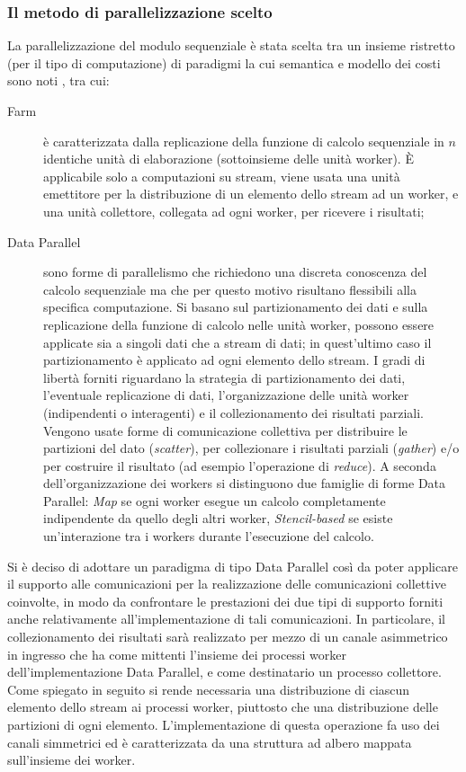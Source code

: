 \subsubsection{Il metodo di parallelizzazione scelto}
La parallelizzazione del modulo sequenziale \`e stata scelta tra un insieme ristretto (per il tipo di computazione) di paradigmi la cui semantica e modello dei costi sono noti \cite{hpc_part1}, tra cui:
\begin{description}
\item [Farm] \`e caratterizzata dalla replicazione della funzione di calcolo sequenziale in $n$ identiche unit\`a di elaborazione (sottoinsieme delle unit\`a worker). \`E applicabile solo a computazioni su stream, viene usata una unit\`a emettitore per la distribuzione di un elemento dello stream ad un worker, e una unit\`a collettore, collegata ad ogni worker, per ricevere i risultati;
\item [Data Parallel] sono forme di parallelismo che richiedono una discreta conoscenza del calcolo sequenziale ma che per questo motivo risultano flessibili alla specifica computazione. Si basano sul partizionamento dei dati e sulla replicazione della funzione di calcolo nelle unit\`a worker, possono essere applicate sia a singoli dati che a stream di dati; in quest'ultimo caso il partizionamento \`e applicato ad ogni elemento dello stream. I gradi di libert\`a forniti riguardano la strategia di partizionamento dei dati, l'eventuale replicazione di dati, l'organizzazione delle unit\`a worker (indipendenti o interagenti) e il collezionamento dei risultati parziali. Vengono usate forme di comunicazione collettiva per distribuire le partizioni del dato (\emph{scatter}), per collezionare i risultati parziali (\emph{gather}) e/o per costruire il risultato (ad esempio l'operazione di \emph{reduce}). A seconda dell'organizzazione dei workers si distinguono due famiglie di forme Data Parallel: \emph{Map} se ogni worker esegue un calcolo completamente indipendente da quello degli altri worker, \emph{Stencil-based} se esiste un'interazione tra i workers durante l'esecuzione del calcolo.
\end{description}
Si \`e deciso di adottare un paradigma di tipo Data Parallel cos\`i da poter applicare il supporto alle comunicazioni per la realizzazione delle comunicazioni collettive coinvolte, in modo da confrontare le prestazioni dei due tipi di supporto forniti anche relativamente all'implementazione di tali comunicazioni. In particolare, il collezionamento dei risultati sar\`a realizzato per mezzo di un canale asimmetrico in ingresso che ha come mittenti l'insieme dei processi worker dell'implementazione Data Parallel, e come destinatario un processo collettore. Come spiegato in seguito si rende necessaria una distribuzione di ciascun elemento dello stream ai processi worker, piuttosto che una distribuzione delle partizioni di ogni elemento. L'implementazione di questa operazione fa uso dei canali simmetrici ed \`e caratterizzata da una struttura ad albero mappata sull'insieme dei worker. \\

